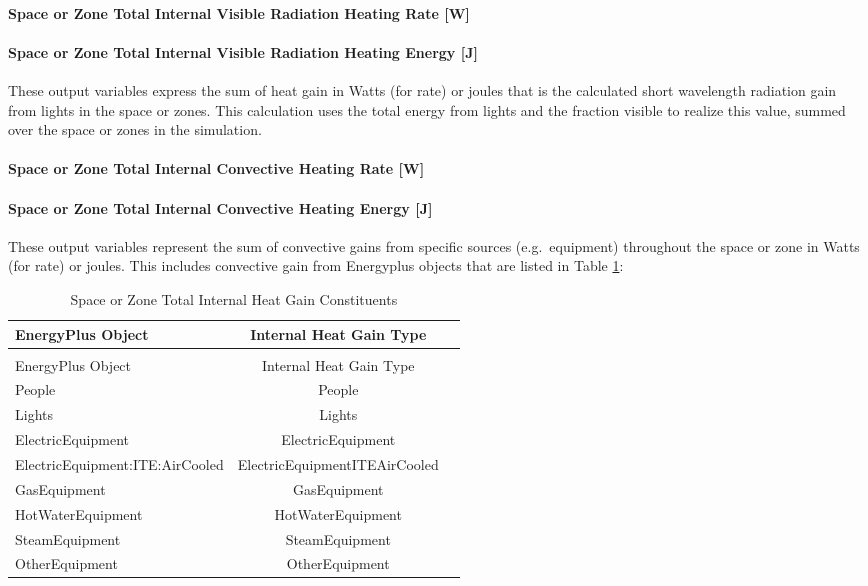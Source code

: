\paragraph{Space or Zone Total Internal Visible Radiation Heating Rate {[}W{]}}\label{zone-total-internal-visible-radiation-heating-rate-w}

\paragraph{Space or Zone Total Internal Visible Radiation Heating Energy {[}J{]}}\label{zone-total-internal-visible-radiation-heating-energy-j}

These output variables express the sum of heat gain in Watts (for rate) or joules that is the calculated short wavelength radiation gain from lights in the space or zones. This calculation uses the total energy from lights and the fraction visible to realize this value, summed over the space or zones in the simulation.

\paragraph{Space or Zone Total Internal Convective Heating Rate {[}W{]}}\label{zone-total-internal-convective-heating-rate-w}

\paragraph{Space or Zone Total Internal Convective Heating Energy {[}J{]}}\label{zone-total-internal-convective-heating-energy-j}

These output variables represent the sum of convective gains from specific sources (e.g.~equipment) throughout the space or zone in Watts (for rate) or joules. This includes convective gain from Energyplus objects that are listed in Table \ref{table:space-or-zone-total-internal-heat-gain-constituents}: 

\begin{longtable}[c]{@{}lcc@{}}
	\caption{Space or Zone Total Internal Heat Gain Constituents} \label{table:space-or-zone-total-internal-heat-gain-constituents} \tabularnewline
	\toprule
	EnergyPlus Object &  Internal Heat Gain Type \tabularnewline
	\midrule
	\endfirsthead
	
	\caption[]{Space or Zone Total Internal Heat Gain Constituents} \tabularnewline
	\toprule
	EnergyPlus Object &  Internal Heat Gain Type \tabularnewline
	\midrule
	\endhead
	
	People   &  People \tabularnewline
	Lights   &  Lights \tabularnewline
	ElectricEquipment   &  ElectricEquipment \tabularnewline
	ElectricEquipment:ITE:AirCooled   &  ElectricEquipmentITEAirCooled \tabularnewline
	GasEquipment   &  GasEquipment \tabularnewline
	HotWaterEquipment   &  HotWaterEquipment \tabularnewline
	SteamEquipment   &  SteamEquipment \tabularnewline
	OtherEquipment   &  OtherEquipment \tabularnewline
	
	\bottomrule

\end{longtable}

